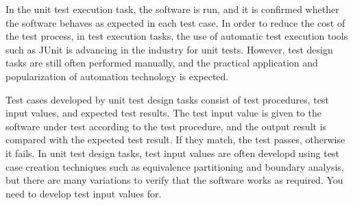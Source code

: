 \documentclass[conference]{IEEEtran}
\begin{document}
In the unit test execution task, the software is run, and it is confirmed whether the software behaves as expected in each test case. In order to reduce the cost of the test process, in test execution tasks, the use of automatic test execution tools such as JUnit is advancing in the industry for unit tests. However, test design tasks are still often performed manually, and the practical application and popularization of automation technology is expected.

Test cases developed by unit test design tasks consist of test procedures, test input values, and expected test results. The test input value is given to the software under test according to the test procedure, and the output result is compared with the expected test result. If they match, the test passes, otherwise it fails. In unit test design tasks, test input values are often developd using test case creation techniques such as equivalence partitioning and boundary analysis, but there are many variations to verify that the software works as required. You need to develop test input values for.

\end{document}
